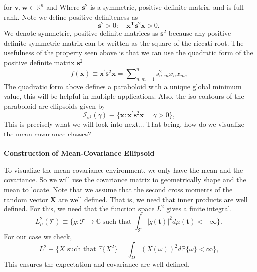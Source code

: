\documentclass{article}
\theoremstyle{definition}
\theoremstyle{remark}
\begin{document}
for $\mathbf{v,w} \in \mathbb{R}^n$ and Where
$\mathbf{s}^2$ is a symmetric, positive definite matrix, and 
is full rank. Note we define positive definiteness as
\[
\mathbf{s}^2 > 0: \quad \mathbf{x^T}\mathbf{s}^2\mathbf{x} > 0.
\]
We denote symmetric, positive definite matrices
as $\mathbf{s}^2$ because any positive definite symmetric 
matrix can be written as the square of the riccati root. 
The usefulness of the property seen above is 
that we can use the quadratic form of the positive definite matrix $\mathbf{s}^2$
\begin{equation}
    f(\boldsymbol{x})\equiv\boldsymbol{x}^{\prime}\boldsymbol{s}^{2}\boldsymbol{x}={\textstyle\sum\nolimits_{n,m=1}^{\bar{n}}} s_{n,m}^{2}x_{n}x_{m}\text{,}
    \end{equation}
The quadratic form above defines a paraboloid
with a unique global minimum value, this will
be helpful in multiple applications.
Also, the iso-contours of the paraboloid
are ellipsoids given by 
\begin{equation}
    \mathcal{I}_{\boldsymbol{s}^{2}}(\gamma)\equiv\{\boldsymbol{x}:\boldsymbol{x}^{\prime}\boldsymbol{s}^{2}\boldsymbol{x}=\gamma > 0\}\text{,}
    \end{equation}
This is precisely what we will look into next... That being, how do we visualize
the mean covariance classes?\\
\\ \textbf{Construction of Mean-Covariance Ellipsoid}\\
\par To visualize the mean-covariance 
environment, we only have the mean and the covariance. 
So we will use the covariance matrix to geometrically shape and
the mean to locate. Note that we assume that the second cross moments of the random vector 
$\mathbf{X}$ are well defined. That is, we need
that inner products are well defined. For this, 
we need that the function space $L^2$ gives a finite integral.
\begin{equation}
    L_{\mu}^{2}(\mathcal{T})\equiv\{g:\mathcal{T}\rightarrow\mathbb{C}\text{ such that }\int_{\mathcal{T}}|g(\boldsymbol{t})|^{2}d\mu(\boldsymbol{t})<+\infty\}\text{.}
    \end{equation}
For our case we check,
\begin{equation}
    L^{2}\equiv\{X\text{ such that }\mathbb{E}\{X^{2}\}=\int_{\Omega}(X(\omega))^{2}d\mathbb{P}\{\omega\}<\infty\}\text{,}
    \end{equation}
This ensures the expectation and covariance are well defined. 
\end{document}
